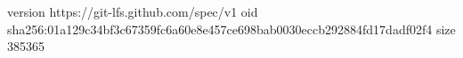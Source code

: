 version https://git-lfs.github.com/spec/v1
oid sha256:01a129c34bf3c67359fc6a60e8e457ce698bab0030eccb292884fd17dadf02f4
size 385365
